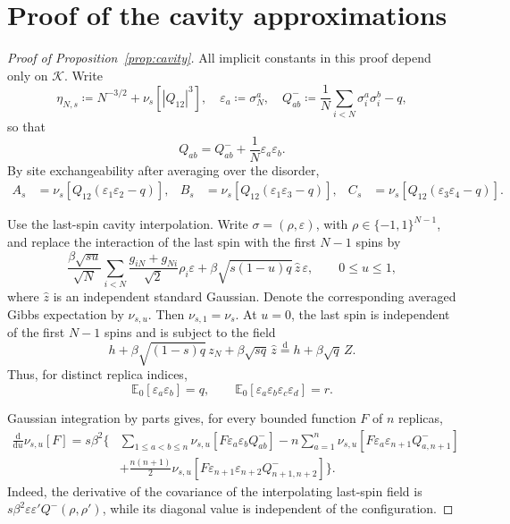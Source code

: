 \documentclass[11pt]{article}
\numberwithin{equation}{section}
\newcommand{\1}{\mathbf 1}
\newcommand{\cK}{\mathcal K}
\begin{document}
\appendix
\section{Proof of the cavity approximations}
\label{app:cavity-identities}

\begin{proof}[Proof of Proposition~\ref{prop:cavity}]
 All implicit constants in this proof depend only on $\cK$.  Write
\[
\eta_{N,s}\coloneqq N^{-3/2}+\nu_s[|Q_{12}|^3] ,\quad  \varepsilon_a\coloneqq\sigma_N^a,
 \quad
 Q^-_{ab}\coloneqq\frac1N\sum_{i<N}\sigma_i^a\sigma_i^b-q,
\]
so that
\begin{equation}
 Q_{ab}=Q^-_{ab}+\frac1N\varepsilon_a\varepsilon_b.
 \label{eq:Qab}
\end{equation}
By site exchangeability after averaging over the disorder,
\begin{align*}
 A_s&=\nu_s\!\left[Q_{12}(\varepsilon_1\varepsilon_2-q)\right],&
 B_s&=\nu_s\!\left[Q_{12}(\varepsilon_1\varepsilon_3-q)\right],&
 C_s&=\nu_s\!\left[Q_{12}(\varepsilon_3\varepsilon_4-q)\right].
\end{align*}

Use the last-spin cavity interpolation.  Write
$\sigma=(\rho,\varepsilon)$, with $\rho\in\{-1,1\}^{N-1}$, and replace
the interaction of the last spin with the first $N-1$ spins by
\[
 \frac{\beta\sqrt{su}}{\sqrt N}
 \sum_{i<N}\frac{g_{iN}+g_{Ni}}{\sqrt2}\rho_i\varepsilon
 +\beta\sqrt{s(1-u)q}\,\widehat z\,\varepsilon,
 \qquad 0\le u\le1,
\]
where $\widehat z$ is an independent standard Gaussian.  Denote the
corresponding averaged Gibbs expectation by $\nu_{s,u}$.  Then
$\nu_{s,1}=\nu_s$.  At $u=0$, the last spin is independent of the first
$N-1$ spins and is subject to the field
\[
 h+\beta\sqrt{(1-s)q}\,z_N+\beta\sqrt{sq}\,\widehat z
 \stackrel{\mathrm d}=h+\beta\sqrt q\,Z.
\]
Thus, for distinct replica indices,
\begin{equation}
 \mathbb E_0[\varepsilon_a\varepsilon_b]=q,
 \qquad
 \mathbb E_0[\varepsilon_a\varepsilon_b\varepsilon_c\varepsilon_d]=r.
 \label{eq:last-spin-moments-proof}
\end{equation}

Gaussian integration by parts gives, for every bounded function $F$ of
$n$ replicas,
\begin{align}
 \frac{\mathrm d}{\mathrm du}\nu_{s,u}[F]
 =s\beta^2\Bigg\{&
 \sum_{1\le a<b\le n}
 \nu_{s,u}[F\varepsilon_a\varepsilon_bQ^-_{ab}]
 -n\sum_{a=1}^n
 \nu_{s,u}[F\varepsilon_a\varepsilon_{n+1}Q^-_{a,n+1}]
 \nonumber\\
 &+\frac{n(n+1)}2
 \nu_{s,u}[F\varepsilon_{n+1}\varepsilon_{n+2}
 Q^-_{n+1,n+2}]
 \Bigg\}.
 \label{eq:cavity-derivative-proof}
\end{align}
Indeed, the derivative of the covariance of the interpolating
last-spin field is
$s\beta^2\varepsilon\varepsilon'Q^-(\rho,\rho')$, while its diagonal
value is independent of the configuration.


\end{proof}
\end{document}
